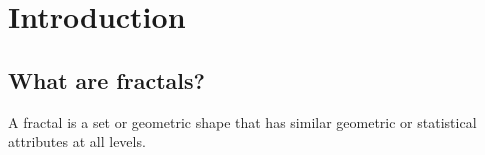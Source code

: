\chapter*{Introduction}
\section{What are fractals?}
A fractal is a set or geometric shape that has similar geometric or statistical
attributes at all levels.
